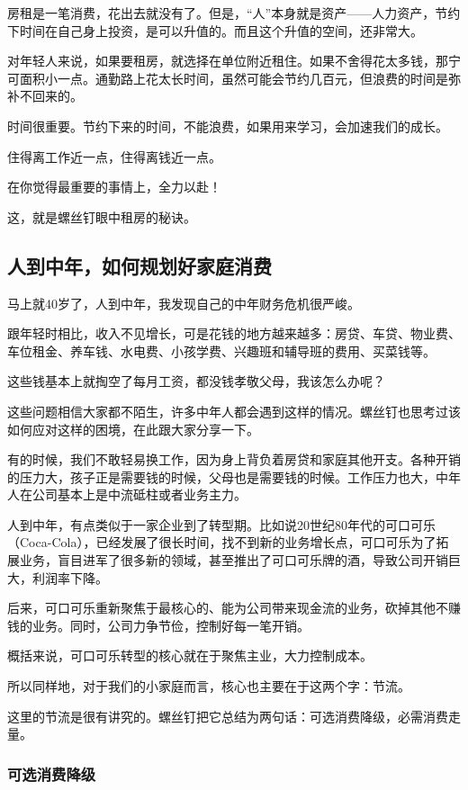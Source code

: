 房租是一笔消费，花出去就没有了。但是，“人”本身就是资产——人力资产，节约下时间在自己身上投资，是可以升值的。而且这个升值的空间，还非常大。

对年轻人来说，如果要租房，就选择在单位附近租住。如果不舍得花太多钱，那宁可面积小一点。通勤路上花太长时间，虽然可能会节约几百元，但浪费的时间是弥补不回来的。

时间很重要。节约下来的时间，不能浪费，如果用来学习，会加速我们的成长。

住得离工作近一点，住得离钱近一点。

在你觉得最重要的事情上，全力以赴！

这，就是螺丝钉眼中租房的秘诀。

\subsection{人到中年，如何规划好家庭消费}
{\kaishu 马上就40岁了，人到中年，我发现自己的中年财务危机很严峻。}

{\kaishu 跟年轻时相比，收入不见增长，可是花钱的地方越来越多：房贷、车贷、物业费、车位租金、养车钱、水电费、小孩学费、兴趣班和辅导班的费用、买菜钱等。}

{\kaishu 这些钱基本上就掏空了每月工资，都没钱孝敬父母，我该怎么办呢？}

这些问题相信大家都不陌生，许多中年人都会遇到这样的情况。螺丝钉也思考过该如何应对这样的困境，在此跟大家分享一下。

有的时候，我们不敢轻易换工作，因为身上背负着房贷和家庭其他开支。各种开销的压力大，孩子正是需要钱的时候，父母也是需要钱的时候。工作压力也大，中年人在公司基本上是中流砥柱或者业务主力。

人到中年，有点类似于一家企业到了转型期。比如说20世纪80年代的可口可乐（Coca-Cola），已经发展了很长时间，找不到新的业务增长点，可口可乐为了拓展业务，盲目进军了很多新的领域，甚至推出了可口可乐牌的酒，导致公司开销巨大，利润率下降。

后来，可口可乐重新聚焦于最核心的、能为公司带来现金流的业务，砍掉其他不赚钱的业务。同时，公司力争节俭，控制好每一笔开销。

概括来说，可口可乐转型的核心就在于聚焦主业，大力控制成本。

所以同样地，对于我们的小家庭而言，核心也主要在于这两个字：节流。

这里的节流是很有讲究的。螺丝钉把它总结为两句话：可选消费降级，必需消费走量。

\subsubsection{可选消费降级}

